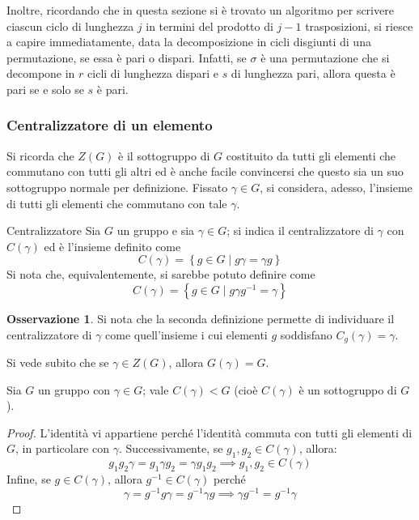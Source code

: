\documentclass[11pt, a4paper]{scrartcl}
\theoremstyle{definition}
\numberwithin{esempio}{section}
\theoremstyle{definition}
\newtheorem{obs}{Osservazione}
\numberwithin{obs}{section}
\numberwithin{nota}{section}
\numberwithin{equation}{subsection}
\begin{document}
Inoltre, ricordando che in questa sezione si \`e trovato un algoritmo per scrivere ciascun ciclo di lunghezza $j$ in termini del prodotto di $j-1$ trasposizioni, si riesce a capire immediatamente, data la decomposizione in cicli disgiunti di una permutazione, se essa \`e pari o dispari.
Infatti, se $\sigma $ \`e una permutazione che si decompone in $r$ cicli di lunghezza dispari e $s$ di lunghezza pari, allora questa \`e pari se e solo se $s$ \`e pari.
\subsubsection{Centralizzatore di un elemento}
Si ricorda che $Z(G)$ \`e il sottogruppo di $G$ costituito da tutti gli elementi che commutano con tutti gli altri ed \`e anche facile convincersi che questo sia un suo sottogruppo normale per definizione.
Fissato $\gamma \in G$, si considera, adesso, l'insieme di tutti gli elementi che commutano con tale $\gamma$.
\begin{definizione}
	{Centralizzatore}{}
	Sia $G$ un gruppo e sia $\gamma\in G$; si indica il centralizzatore di $\gamma$ con $C(\gamma)$ ed \`e l'insieme definito come
	\[
	C(\gamma) = \left\{ g\in G  \mid g \gamma = \gamma g \right\} 
	\] 
	Si nota che, equivalentemente, si sarebbe potuto definire come
	\[
	C(\gamma) = \left\{ g \in G  \mid g \gamma g^{-1} = \gamma \right\} 
	\] 
\end{definizione}
\begin{obs}
	Si nota che la seconda definizione permette di individuare il centralizzatore di $\gamma$ come quell'insieme i cui elementi $g$ soddisfano $C_g(\gamma)=\gamma$.
\end{obs}
\noindent Si vede subito che se $\gamma \in Z(G)$, allora $G(\gamma) = G$.
\begin{prop}
	{}{}
	Sia $G$ un gruppo con $\gamma\in G$; vale $C(\gamma) < G$ (cio\`e $C(\gamma)$ \`e un sottogruppo di $G$).
	\begin{proof}
		L'identit\`a vi appartiene perch\'e l'identit\`a commuta con tutti gli elementi di $G$, in particolare con $\gamma$.
		Successivamente, se $g_1,g_{2}\in C(\gamma)$, allora:
		\[
g_1 g_2 \gamma = g_1\gamma g_2 = \gamma g_1g_2 \implies g_1,g_2 \in C(\gamma)
		\] 
		Infine, se $g \in C(\gamma)$, allora $g^{-1} \in C(\gamma)$ perch\'e
		\[
		\gamma=g^{-1}g \gamma = g^{-1} \gamma g\implies \gamma g^{-1} = g^{-1} \gamma
		\] 
	\end{proof}
\end{prop}
\end{document}
